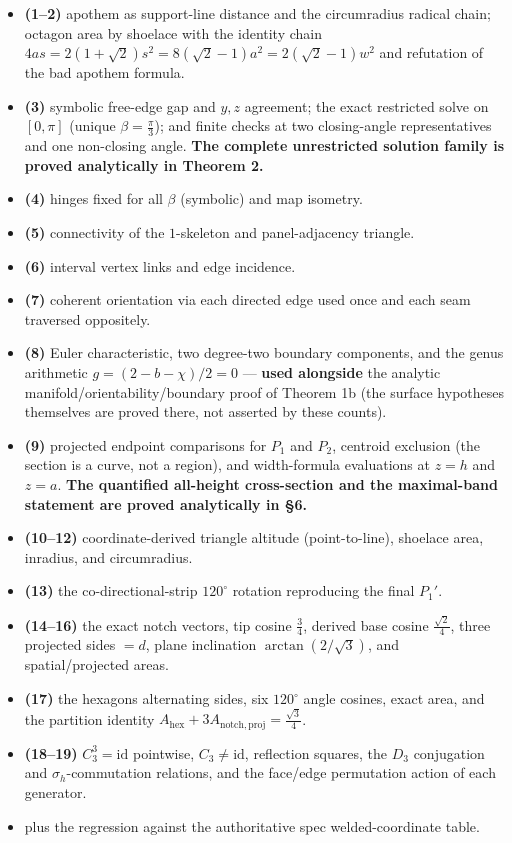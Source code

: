 \documentclass[
  11pt,
  a4paper,
]{article}
\providecommand{\tightlist}{%
  \setlength{\itemsep}{0pt}\setlength{\parskip}{0pt}}
\begin{document}
\begin{itemize}
\tightlist
\item
  \textbf{(1--2)} apothem as support-line distance and the circumradius radical chain; octagon area by shoelace with the identity chain \(4as=2(1+\sqrt2)s^2=8(\sqrt2-1)a^2=2(\sqrt2-1)w^2\) and refutation of the bad apothem formula.
\item
  \textbf{(3)} symbolic free-edge gap and \(y,z\) agreement; the exact restricted solve on \([0,\pi]\) (unique \(\beta=\tfrac\pi3\)); and finite checks at two closing-angle representatives and one non-closing angle. \textbf{The complete unrestricted solution family is proved analytically in Theorem 2.}
\item
  \textbf{(4)} hinges fixed for all \(\beta\) (symbolic) and map isometry.
\item
  \textbf{(5)} connectivity of the \(1\)-skeleton and panel-adjacency triangle.
\item
  \textbf{(6)} interval vertex links and edge incidence.
\item
  \textbf{(7)} coherent orientation via each directed edge used once and each seam traversed oppositely.
\item
  \textbf{(8)} Euler characteristic, two degree-two boundary components, and the genus arithmetic \(g=(2-b-\chi)/2=0\) --- \textbf{used alongside} the analytic manifold/orientability/boundary proof of Theorem 1b (the surface hypotheses themselves are proved there, not asserted by these counts).
\item
  \textbf{(9)} projected endpoint comparisons for \(P_1\) and \(P_2\), centroid exclusion (the section is a curve, not a region), and width-formula evaluations at \(z=h\) and \(z=a\). \textbf{The quantified all-height cross-section and the maximal-band statement are proved analytically in §6.}
\item
  \textbf{(10--12)} coordinate-derived triangle altitude (point-to-line), shoelace area, inradius, and circumradius.
\item
  \textbf{(13)} the co-directional-strip \(120^\circ\) rotation reproducing the final \(P_1'\).
\item
  \textbf{(14--16)} the exact notch vectors, tip cosine \(\tfrac34\), derived base cosine \(\tfrac{\sqrt2}{4}\), three projected sides \(=d\), plane inclination \(\arctan(2/\sqrt3)\), and spatial/projected areas.
\item
  \textbf{(17)} the hexagon\textquotesingle s alternating sides, six \(120^\circ\) angle cosines, exact area, and the partition identity \(A_{\mathrm{hex}}+3A_{\mathrm{notch,proj}}=\tfrac{\sqrt3}{4}\).
\item
  \textbf{(18--19)} \(C_3^3=\mathrm{id}\) pointwise, \(C_3\ne\mathrm{id}\), reflection squares, the \(D_3\) conjugation and \(\sigma_h\)-commutation relations, and the face/edge permutation action of each generator.
\item
  plus the regression against the authoritative spec welded-coordinate table.
\end{itemize}
\end{document}
